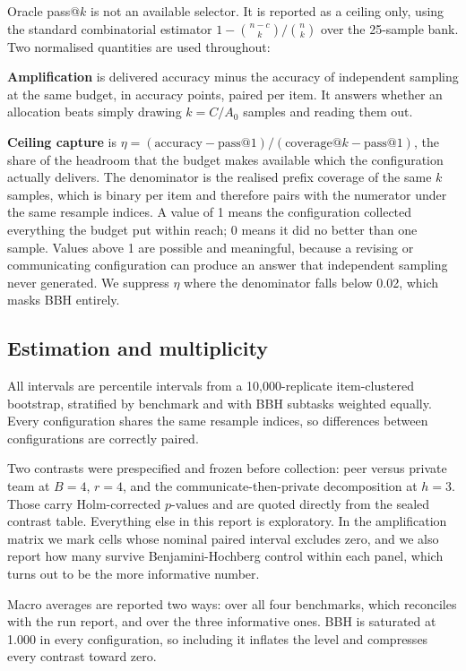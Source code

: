 \documentclass[11pt]{article}
\begin{document}
Oracle pass@$k$ is not an available selector. It is reported as a ceiling only, using the standard
combinatorial estimator $1 - \binom{n-c}{k} / \binom{n}{k}$ over the 25-sample bank. Two normalised
quantities are used throughout:

\textbf{Amplification} is delivered accuracy minus the accuracy of independent sampling at the same
budget, in accuracy points, paired per item. It answers whether an allocation beats simply drawing
$k = C/A_0$ samples and reading them out.

\textbf{Ceiling capture} is $\eta = (\text{accuracy} - \text{pass@1}) / (\text{coverage@}k -
\text{pass@1})$, the share of the headroom that the budget makes available which the configuration
actually delivers. The denominator is the realised prefix coverage of the same $k$ samples, which
is binary per item and therefore pairs with the numerator under the same resample indices. A value
of 1 means the configuration collected everything the budget put within reach; 0 means it did no
better than one sample. Values above 1 are possible and meaningful, because a revising or
communicating configuration can produce an answer that independent sampling never generated. We
suppress $\eta$ where the denominator falls below 0.02, which masks BBH entirely.

\subsection{Estimation and multiplicity}

All intervals are percentile intervals from a 10{,}000-replicate item-clustered bootstrap,
stratified by benchmark and with BBH subtasks weighted equally. Every configuration shares the same
resample indices, so differences between configurations are correctly paired.

Two contrasts were prespecified and frozen before collection: peer versus private team at $B{=}4$,
$r{=}4$, and the communicate-then-private decomposition at $h{=}3$. Those carry Holm-corrected
$p$-values and are quoted directly from the sealed contrast table. Everything else in this report
is exploratory. In the amplification matrix we mark cells whose nominal paired interval excludes
zero, and we also report how many survive Benjamini-Hochberg control within each panel, which
turns out to be the more informative number.

Macro averages are reported two ways: over all four benchmarks, which reconciles with the run
report, and over the three informative ones. BBH is saturated at 1.000 in every configuration, so
including it inflates the level and compresses every contrast toward zero.
\end{document}
